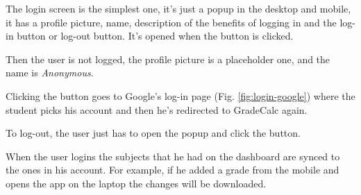 The login screen is the simplest one, it's just a popup in the desktop and mobile, it has a profile picture, name, description of the benefits of logging in and the log-in  button or log-out  button. It's opened when the  button is clicked.

Then the user is not logged, the profile picture is a placeholder one, and the name is \textit{Anonymous}.

Clicking the  button goes to Google's log-in page (Fig. \ref{fig:login-google}) where the student picks his account and then he's redirected to GradeCalc again.

To log-out, the user just has to open the popup and click the  button.

When the user logins the subjects that he had on the dashboard are synced to the ones in his account. For example, if he added a grade from the mobile and opens the app on the laptop the changes will be downloaded.

